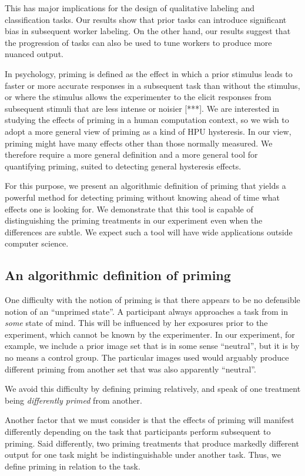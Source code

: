 \documentclass[a4paper]{report}
\begin{document}
This has major implications for the design of qualitative labeling and 
classification tasks.  Our results show that prior tasks can introduce 
significant bias in subsequent worker labeling.  On the other hand, our 
results suggest that the progression of tasks can also be used to tune 
workers to produce more nuanced output.

In psychology, priming is defined as the effect in which a prior stimulus leads
to faster or more accurate responses in a subsequent task than without the
stimulus, or where the stimulus allows the experimenter to the elicit 
responses from subsequent stimuli that are less intense or noisier [***].
We are interested in studying the effects of priming in a human computation
context, so we wish to adopt a more general view of priming as a kind of 
HPU hysteresis.  In our view, priming might have many effects other than
those normally measured.  We therefore require a more general definition and a 
more general tool for quantifying priming, suited to detecting general 
hysteresis effects.

For this purpose, we present an algorithmic definition of priming that
yields a powerful method for detecting priming without knowing ahead of time 
what effects one is looking for.  We demonstrate that this tool is capable of 
distinguishing the priming treatments in our experiment even when the 
differences are subtle.  We expect such a tool will have wide applications 
outside computer science.

\subsection*{An algorithmic definition of priming}

One difficulty with the notion of priming is that there appears to be no 
defensible notion of an ``unprimed state''.  A participant always approaches
a task from in \textit{some} state of mind.  This will be influenced by her
exposures prior to the experiment, which cannot be known by the experimenter.  
In our experiment, for example, we include a prior image set that is in some
sense ``neutral'', but it is by no means a control group. The particular 
images used would arguably produce different priming from another set that
was also apparently ``neutral''.

We avoid this difficulty by defining priming relatively, and speak of one
treatment being \textit{differently primed} from another.

Another factor that we must consider is that the effects of priming will
manifest differently depending on the task that participants perform 
subsequent to priming.  Said differently, two priming treatments that
produce markedly different output for one task might be 
indistinguishable under another task.  Thus, we define priming
in relation to the task.
\end{document}
